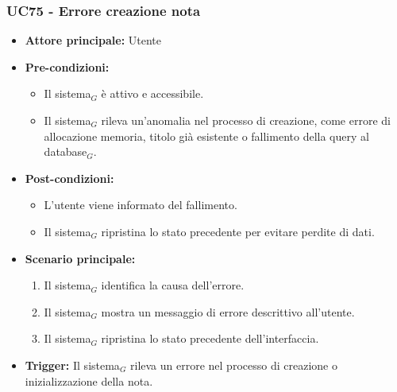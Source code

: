 \documentclass[a4paper, 10pt]{article}
\begin{document}
\subsubsection{UC75 - Errore creazione nota}
\hypertarget{uc:75}{}
\begin{itemize}
    \item \textbf{Attore principale:} Utente
    \item \textbf{Pre-condizioni:} 
        \begin{itemize}
            \item Il sistema$_G$ è attivo e accessibile.
            \item Il sistema$_G$ rileva un'anomalia nel processo di creazione, come errore di allocazione memoria, titolo già esistente o fallimento della query al database$_G$.
        \end{itemize}
    \item \textbf{Post-condizioni:} 
        \begin{itemize}
            \item L'utente viene informato del fallimento.
            \item Il sistema$_G$ ripristina lo stato precedente per evitare perdite di dati.
        \end{itemize}
    \item \textbf{Scenario principale:}
        \begin{enumerate}
            \item Il sistema$_G$ identifica la causa dell'errore.
            \item Il sistema$_G$ mostra un messaggio di errore descrittivo all'utente.
            \item Il sistema$_G$ ripristina lo stato precedente dell'interfaccia.
        \end{enumerate}
    \item \textbf{Trigger:} Il sistema$_G$ rileva un errore nel processo di creazione o inizializzazione della nota.
\end{itemize}
\end{document}
